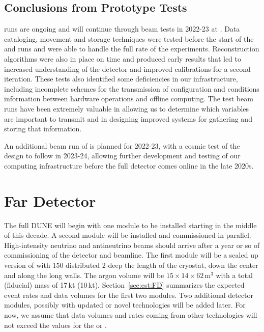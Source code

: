 \documentclass[../main-v1.tex]{subfiles}
\begin{document}
\subsection{Conclusions from Prototype Tests }

runs are ongoing and will continue through beam tests in 2022-23 at .  Data cataloging, movement and storage techniques were tested before the start of the  and   runs and were able to handle the full rate of the experiments.   Reconstruction algorithms were also in place on time and %
produced early results that led to increased understanding of the detector and improved calibrations for a second iteration.  These tests also identified some deficiencies in our infrastructure, including incomplete schemes for the transmission of configuration and conditions information between hardware operations and  offline computing.  The test beam runs have been extremely valuable in allowing us to determine which variables are important to transmit and in designing improved systems for gathering and storing that information. 

An additional beam run of   is planned for 2022-23, with a cosmic test of the  design to follow in 2023-24, allowing further development and testing of our computing infrastructure before the full detector comes online in the late 2020s. 


\section{Far Detector %
}
\label{sec:intro-fd}

The full DUNE  will begin with one  module to be installed %
starting in the middle of  this decade.  A second  module will be installed and commissioned in parallel.  High-intensity neutrino and antineutrino beams should arrive after a year or so of commissioning of the detector and  beamline.  The first %
module will %
be a scaled up version of  with 150  distributed 2-deep %
the length of the cryostat, down the center and along the long walls. %
The argon volume will be $15\times14\times62$\,m$^3$ with a total (fiducial) mass of 17\,kt (10\,kt).  Section~\ref{sec:est:FD} summarizes the expected event rates and data volumes for the first two modules.  Two additional detector modules, possibly with updated or novel technologies %
will be added later. For now, we assume that data volumes and rates coming from other technologies will not exceed %
the values for the  or .
\end{document}
